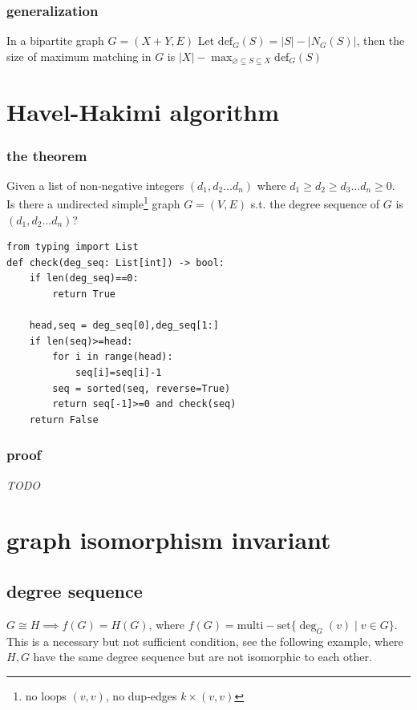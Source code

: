 \documentclass{article}
\begin{document}
\subsubsection{generalization}

In a bipartite graph $G=(X+Y,E)$
Let $\mathrm{def}_G(S)=|S|-|N_G(S)|$,
then the size of maximum matching in $G$ is $|X|-\max_{\varnothing\subseteq S\subseteq X}\mathrm{def}_G(S)$

\newpage
\section{Havel-Hakimi algorithm}

\subsubsection{the theorem}

Given a list of non-negative integers $(d_1,d_2\ldots d_n)$ where $d_1\geq d_2\geq d_3\ldots d_n\geq 0$.\\
Is there a undirected simple\footnote{no loops $(v,v)$, no dup-edges $k\times (v,v)$} graph $G=(V,E)$ s.t. the degree sequence of $G$ is $(d_1,d_2\ldots d_n)$?

\begin{verbatim}
from typing import List
def check(deg_seq: List[int]) -> bool:
    if len(deg_seq)==0:
        return True

    head,seq = deg_seq[0],deg_seq[1:]
    if len(seq)>=head:
        for i in range(head):
            seq[i]=seq[i]-1
        seq = sorted(seq, reverse=True)
        return seq[-1]>=0 and check(seq)
    return False
\end{verbatim}

\subsubsection{proof}

\emph{TODO}



\newpage
\section{graph isomorphism invariant}

\subsection{degree sequence}

$G\cong H\implies f(G)=H(G)$, where $f(G)=\mathrm{multi-set}\{\deg_G(v)\mid v\in G\}$.\\
This is a necessary but not sufficient condition, see the following example, where $H,G$ have the same degree sequence but are not isomorphic to each other.
\end{document}
